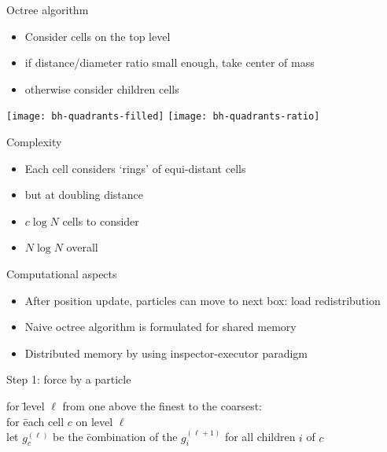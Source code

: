 \begin{frame}{Octree algorithm}
  \begin{itemize}
  \item Consider cells on the top level
  \item if distance/diameter ratio small enough, take center of mass
  \item otherwise consider children cells
  \end{itemize}
\end{frame}

\begin{frame}
  \texttt{[image: bh-quadrants-filled]}
  \texttt{[image: bh-quadrants-ratio]}
\end{frame}

\begin{frame}{Complexity}
  \begin{itemize}
  \item Each cell considers `rings' of equi-distant cells
  \item but at doubling distance
  \item $c\log N$ cells to consider
  \item $N\log N$ overall
  \end{itemize}  
\end{frame}

\begin{frame}{Computational aspects}
  \begin{itemize}
  \item After position update, particles can move to next box: load redistribution
  \item Naive octree algorithm is formulated for shared memory
  \item Distributed memory by using inspector-executor paradigm
  \end{itemize}
\end{frame}

\begin{frame}{Step 1: force by a particle}
  \begin{tabbing}
    for \=level $\ell$ from one above the finest to the coarsest:\\
    \>for \=each cell $c$ on level $\ell$\\
    \>\>let $g^{(\ell)}_c$ be the \=combination of the $g^{(\ell+1)}_i$
    for all children $i$ of $c$
  \end{tabbing}
\end{frame}

